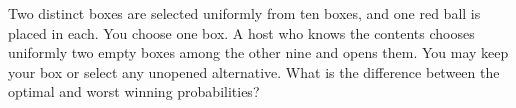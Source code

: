 Two distinct boxes are selected uniformly from ten boxes, and one red ball is placed in each. You choose one box. A host who knows the contents chooses uniformly two empty boxes among the other nine and opens them. You may keep your box or select any unopened alternative. What is the difference between the optimal and worst winning probabilities?
